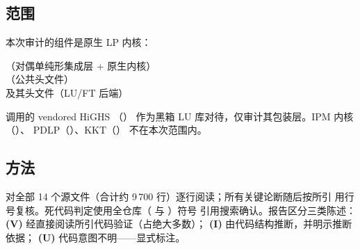 \documentclass[11pt]{ctexart}
\begin{document}
\subsection{范围}
本次审计的组件是原生 LP 内核：
\begin{center}
（对偶单纯形集成层 +  原生内核）\\
（公共头文件）\\
 及其头文件（LU/FT 后端）
\end{center}
 调用的 vendored HiGHS 
（）
作为黑箱 LU 库对待，仅审计其包装层。IPM 内核（）、
PDLP（）、KKT（）
不在本次范围内。

\subsection{方法}
对全部 14 个源文件（合计约 9\,700 行）逐行阅读；所有关键论断随后按所引
用行号复核。死代码判定使用全仓库（ 与 ）符号
引用搜索确认。报告区分三类陈述：
\textbf{(V)} 经直接阅读所引代码验证（占绝大多数）；
\textbf{(I)} 由代码结构推断，并明示推断依据；
\textbf{(U)} 代码意图不明——显式标注。
\end{document}
